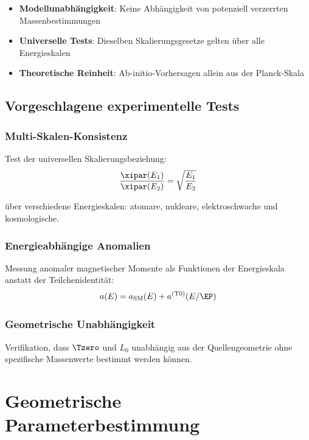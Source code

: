 	\begin{itemize}
		\item \textbf{Modellunabhängigkeit}: Keine Abhängigkeit von potenziell verzerrten Massenbestimmungen
		\item \textbf{Universelle Tests}: Dieselben Skalierungsgesetze gelten über alle Energieskalen
		\item \textbf{Theoretische Reinheit}: Ab-initio-Vorhersagen allein aus der Planck-Skala
	\end{itemize}
	
	\subsection{Vorgeschlagene experimentelle Tests}
	\label{subsec:experimental_tests}
	
	\subsubsection{Multi-Skalen-Konsistenz}
	
	Test der universellen Skalierungsbeziehung:
	\begin{equation}
		\frac{\xipar(E_1)}{\xipar(E_2)} = \sqrt{\frac{E_1}{E_2}}
		\label{eq:scaling_test}
	\end{equation}
	
	über verschiedene Energieskalen: atomare, nukleare, elektroschwache und kosmologische.
	
	\subsubsection{Energieabhängige Anomalien}
	
	Messung anomaler magnetischer Momente als Funktionen der Energieskala anstatt der Teilchenidentität:
	\begin{equation}
		a(E) = a_{\text{SM}}(E) + a^{(\text{T0})}(E/\EP)
		\label{eq:energy_dependent_anomaly}
	\end{equation}
	
	\subsubsection{Geometrische Unabhängigkeit}
	
	Verifikation, dass $\Tzero$ und $L_0$ unabhängig aus der Quellengeometrie ohne spezifische Massenwerte bestimmt werden können.
	
	\section{Geometrische Parameterbestimmung}
	\label{sec:geometric_parameters}
	

